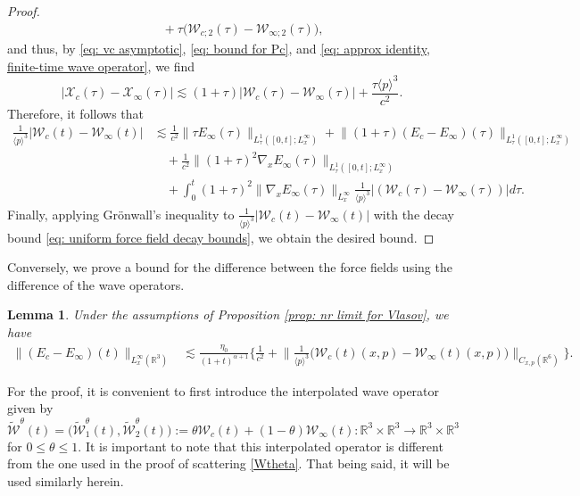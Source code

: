 \documentclass[reqno, 11pt, letterpaper]{amsart}
\newtheorem{lemma}[theorem]{Lemma}
\theoremstyle{remark}
\numberwithin{equation}{section}
\numberwithin{theorem}{section}
\numberwithin{table}{section}
\numberwithin{figure}{section}
\begin{document}
\begin{proof}
$$\begin{aligned}
&\quad+\tau \big(\mathcal{W}_{c;2}(\tau)-\mathcal{W}_{\infty;2}(\tau)\big),
\end{aligned}$$
and thus, by \eqref{eq: vc asymptotic}, \eqref{eq: bound for Pc}, and \eqref{eq: approx identity, finite-time wave operator}, we find
$$|\mathcal{X}_c(\tau)-\mathcal{X}_\infty(\tau)|\lesssim(1+\tau)|\mathcal{W}_{c}(\tau)-\mathcal{W}_{\infty}(\tau)|+\frac{\tau\langle p\rangle^3}{c^2}.$$
Therefore, it follows that 
$$\begin{aligned}
\frac{1}{\langle p\rangle^3}|\mathcal{W}_{c}(t)-\mathcal{W}_{\infty}(t)|&\lesssim \frac{1}{c^2}\|\tau E_\infty(\tau)\|_{L_{\tau}^1([0,t]; L_x^\infty)}+\big\|(1+\tau)(E_c-E_\infty)(\tau)\big\|_{L_{\tau}^1([0,t]; L_x^\infty)}\\
&\quad+\frac{1}{c^2}\|(1+\tau)^2 \nabla_x E_\infty(\tau)\|_{L_{\tau}^1([0,t]; L_x^\infty)}\\
&\quad+\int_0^t(1+\tau)^2\|\nabla_x E_\infty(\tau)\|_{L_x^\infty}\frac{1}{\langle p\rangle^3}|(\mathcal{W}_c(\tau)-\mathcal{W}_\infty(\tau))|d\tau.
\end{aligned}$$
Finally, applying Gr\"onwall's inequality to $\frac{1}{\langle p\rangle^3}|\mathcal{W}_{c}(t)-\mathcal{W}_{\infty}(t)|$ with the decay bound \eqref{eq: uniform force field decay bounds}, we obtain the desired bound.
\end{proof}

Conversely, we prove a bound for the difference between the force fields using the difference of the wave operators.

\begin{lemma}\label{lemma: difference between force fields}
Under the assumptions of Proposition \ref{prop: nr limit for Vlasov}, we have
$$\begin{aligned}
\|(E_c-E_\infty)(t)\|_{L_x^\infty(\mathbb{R}^3)}&\lesssim\frac{\eta_0}{(1+t)^{\alpha+1}}\bigg\{\frac{1}{c^2}+\Big\|\frac{1}{\langle p\rangle^3}\Big(\mathcal{W}_c(t)(x,p)-\mathcal{W}_\infty(t)(x,p)\Big)\Big\|_{C_{x,p}(\mathbb{R}^6)}\bigg\}.
\end{aligned}$$
\end{lemma}

For the proof, it is convenient to first introduce the interpolated wave operator given by 
\begin{equation}\label{eq: interpolated wave operator}
\widetilde{\mathcal{W}}^\theta(t)=\big(\widetilde{\mathcal{W}}_1^\theta(t),\widetilde{\mathcal{W}}_2^\theta(t)\big):=\theta\mathcal{W}_c(t)+(1-\theta)\mathcal{W}_\infty(t):\mathbb{R}^3\times\mathbb{R}^3\to\mathbb{R}^3\times\mathbb{R}^3
\end{equation}
for $0\leq\theta\leq1$. It is important to note that this interpolated operator is different from the one used in the proof of scattering \eqref{Wtheta}. That being said, it will be used similarly herein.
\end{document}
